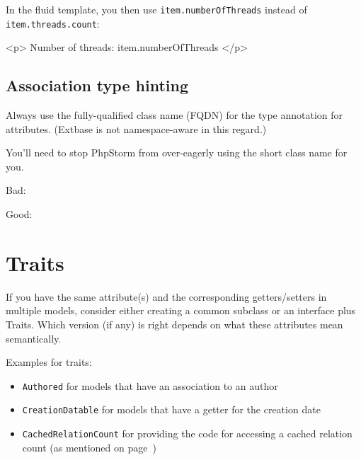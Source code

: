 In the fluid template, you then use \texttt{item.numberOfThreads} instead of \texttt{item.threads.count}:

\begin{htmlcode}
<p>
  Number of threads: {item.numberOfThreads}
</p>
\end{htmlcode}


\subsection{Association type hinting}
Always use the fully-qualified class name (FQDN) for the type annotation for attributes. (Extbase is not namespace-aware in this regard.)

You'll need to stop PhpStorm from over-eagerly using the short class name for you.

Bad:


Good:



\section{Traits}

If you have the same attribute(s) and the corresponding getters/setters in multiple models, consider either creating a common subclass or an interface plus Traits. Which version (if any) is right depends on what these attributes mean semantically.

Examples for traits:

\begin{itemize}
  \item \texttt{Authored} for models that have an association to an author
  \item \texttt{CreationDatable} for models that have a getter for the creation date
  \item \texttt{CachedRelationCount} for providing the code for accessing a cached relation count (as mentioned on page~\pageref{relation-count})
\end{itemize}


